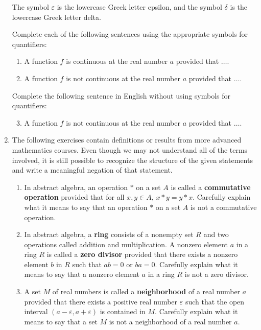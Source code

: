 \begin{enumerate}
\note  The symbol  $\varepsilon $ is  the lowercase Greek letter epsilon,  and the symbol  $\delta $ is  the lowercase Greek letter delta.

Complete each of the following sentences using the appropriate symbols for quantifiers:
  \begin{enumerate}
    \item A function  $f$  is continuous at the real number  $a$  provided that $ \ldots .$
    \item A function  $f$  is not continuous at the real number  $a$  provided that $ \ldots .$
  \end{enumerate}

Complete the following sentence in English without using symbols for quantifiers:
\begin{enumerate}
\setcounter{enumii}{2}
  \item A function  $f$  is not continuous at the real number  $a$  provided that $ \ldots .$
\end{enumerate}


\item The following exercises contain definitions or results from more advanced mathematics courses.  Even though we may not understand all of the terms involved, it is still possible to recognize the structure of the given statements and write a meaningful negation of that statement. \label{exer:advanced}
\begin{enumerate}
  \item In abstract algebra, an operation $*$ on a set $A$ is called a \textbf{commutative operation} 
%
 provided that for all $x, y \in A$, $x * y = y * x$.  Carefully explain what it means to say that an operation $*$ on a set $A$ is not a commutative operation.
  \item In abstract algebra, a \textbf{ring} 
%
consists of a nonempty set $R$ and two operations called addition and multiplication.  A nonzero element $a$ in a ring $R$ is called a \textbf{zero divisor} 
%
provided that there exists a nonzero element $b$ in $R$ such that $ab = 0$ or $ba = 0$.  Carefully explain what it means to say that a nonzero element $a$ in a ring $R$ is not a zero divisor.


\item A set $M$ of real numbers is called a \textbf{neighborhood} 
%
 of a real number $a$ provided that there exists a positive real number $\varepsilon$ such that the open interval 
$(a - \varepsilon, a + \varepsilon)$ is contained in $M$.  Carefully explain what it means to say that a set $M$ is not a neighborhood of a real number $a$.


\end{enumerate}
\end{enumerate}
